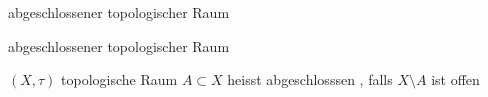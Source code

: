 \documentclass[class=article, crop=false]{standalone}
\begin{document}
\begin{zettel}{abgeschlossener topologischer Raum}
\begin{flashcard}[mn00feti]{abgeschlossener topologischer Raum}
	\begin{definition}[abgeschlossen]
		$(X, \tau )$  topologische Raum $ A \subset X$  heisst abgeschlosssen , falls $ X \setminus A$  ist offen
	\end{definition}

\end{flashcard}
\end{zettel}
\end{document}
